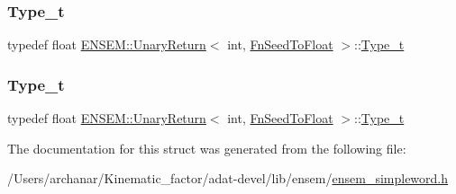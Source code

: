\mbox{\label{structENSEM_1_1UnaryReturn_3_01int_00_01FnSeedToFloat_01_4_ae22c1dee5b905b38ddda98907a2eb2fd}} 
\subsubsection{\texorpdfstring{Type\_t}{Type\_t}\hspace{0.1cm}{\footnotesize\ttfamily [2/3]}}
{\footnotesize\ttfamily typedef float \mbox{\hyperlink{structENSEM_1_1UnaryReturn}{E\+N\+S\+E\+M\+::\+Unary\+Return}}$<$ int, \mbox{\hyperlink{structENSEM_1_1FnSeedToFloat}{Fn\+Seed\+To\+Float}} $>$\+::\mbox{\hyperlink{structENSEM_1_1UnaryReturn_3_01int_00_01FnSeedToFloat_01_4_ae22c1dee5b905b38ddda98907a2eb2fd}{Type\+\_\+t}}}

\mbox{\label{structENSEM_1_1UnaryReturn_3_01int_00_01FnSeedToFloat_01_4_ae22c1dee5b905b38ddda98907a2eb2fd}} 
\subsubsection{\texorpdfstring{Type\_t}{Type\_t}\hspace{0.1cm}{\footnotesize\ttfamily [3/3]}}
{\footnotesize\ttfamily typedef float \mbox{\hyperlink{structENSEM_1_1UnaryReturn}{E\+N\+S\+E\+M\+::\+Unary\+Return}}$<$ int, \mbox{\hyperlink{structENSEM_1_1FnSeedToFloat}{Fn\+Seed\+To\+Float}} $>$\+::\mbox{\hyperlink{structENSEM_1_1UnaryReturn_3_01int_00_01FnSeedToFloat_01_4_ae22c1dee5b905b38ddda98907a2eb2fd}{Type\+\_\+t}}}



The documentation for this struct was generated from the following file\+:\begin{DoxyCompactItemize}
\item 
/\+Users/archanar/\+Kinematic\+\_\+factor/adat-\/devel/lib/ensem/\mbox{\hyperlink{adat-devel_2lib_2ensem_2ensem__simpleword_8h}{ensem\+\_\+simpleword.\+h}}\end{DoxyCompactItemize}
